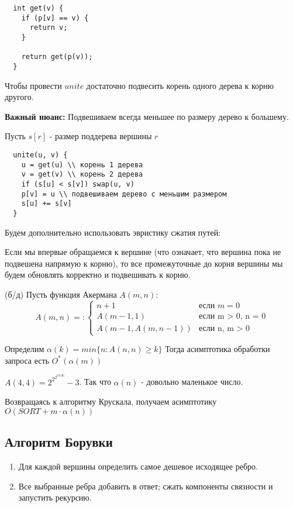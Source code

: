 \begin{verbatim}
  int get(v) {
    if (p[v] == v) {
      return v;
    }

    return get(p(v));
  }
\end{verbatim}

Чтобы провести $unite$ достаточно подвесить корень одного дерева к корню другого.

\textbf{Важный нюанс:} Подвешиваем всегда меньшее по размеру дерево к большему. 

Пусть $s[r]$ - размер поддерева вершины $r$
\begin{verbatim}
  unite(u, v) {
    u = get(u) \\ корень 1 дерева
    v = get(v) \\ корень 2 дерева
    if (s[u] < s[v]) swap(u, v)
    p[v] = u \\ подвешиваем дерево с меньшим размером
    s[u] += s[v]
  }
\end{verbatim}

Будем дополнительно использовать эвристику сжатия путей:

Если мы впервые обращаемся к вершине (что означает, что вершина пока не подвешена напрямую к корню), то все промежуточные до корня вершины мы будем обновлять корректно и подвешивать к корню. 

\begin{theorem}{(б/д)}
  Пусть функция Акермана $A(m, n):$
  \begin{equation}
    A(m, n) =: 
    \begin{cases}
      n + 1 & \text{если $m = 0$}\\
      A(m - 1, 1) & \text{если m > 0, n = 0}\\
      A(m - 1, A(m, n - 1)) & \text{если n, m > 0}
    \end{cases}
  \end{equation}

   Определим $\alpha(k) = min \{n: A(n, n) \ge k \}$ Тогда асимптотика обработки запроса есть $O^*(\alpha(m))$
\end{theorem}
\begin{note}
  $A(4, 4) = 2^{2^{2^{65536}}} - 3$. Так что $\alpha(n)$ - довольно маленькое число.
\end{note}

\noindent
Возвращаясь к алгоритму Крускала, получаем асимптотику $O(SORT + m \cdot \alpha(n))$

\subsection{Алгоритм Борувки}
\begin{enumerate}
  \item Для каждой вершины определить самое дешевое исходящее ребро.
  \item Все выбранные ребра добавить в ответ; сжать компоненты связности и запустить рекурсию. 
\end{enumerate}

